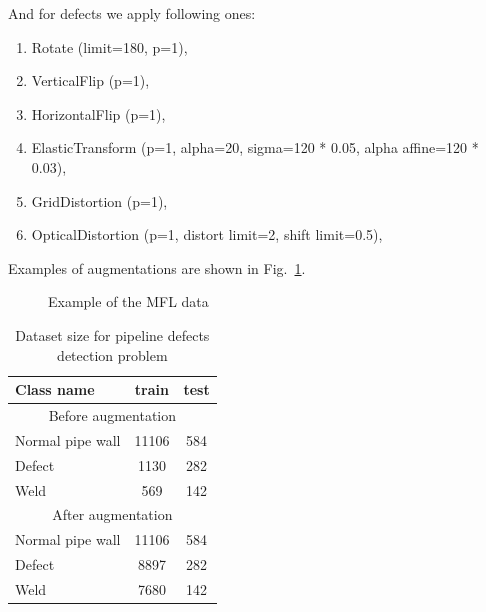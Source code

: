 And for defects we apply following ones:
\begin{enumerate}
	\item Rotate (limit=180, p=1),
	\item VerticalFlip (p=1), 
	\item HorizontalFlip (p=1), 
	\item ElasticTransform (p=1, alpha=20, sigma=120 * 0.05, alpha affine=120 * 0.03), 
	\item GridDistortion (p=1),
	\item OpticalDistortion (p=1, distort limit=2, shift limit=0.5),
\end{enumerate}
Examples of augmentations are shown in Fig.~\ref{ris:aug_example}.
\begin{figure}[ht]
	\caption{Example of the MFL data}
	\label{ris:aug_example}
\end{figure}


\begin{table}[!htb]
	\caption{\label{tab:alg1}Dataset size for pipeline defects detection problem}
	\begin{center}
		\small
		\begin{tabular}{| l | c | c |}
			\hline
			Class name & train & test \\
			\hline
			\multicolumn{3}{|c|}{Before augmentation}  \\
			\hline
			Normal pipe wall  & 11106 & 584 \\
			Defect & 1130 & 282 \\
			Weld & 569 & 142 \\
			\hline
			\multicolumn{3}{|c|}{After augmentation}  \\
			\hline
			Normal pipe wall & 11106 & 584 \\
			Defect & 8897 & 282 \\
			Weld & 7680 & 142 \\
			\hline
		\end{tabular}
	\end{center}
\end{table}

